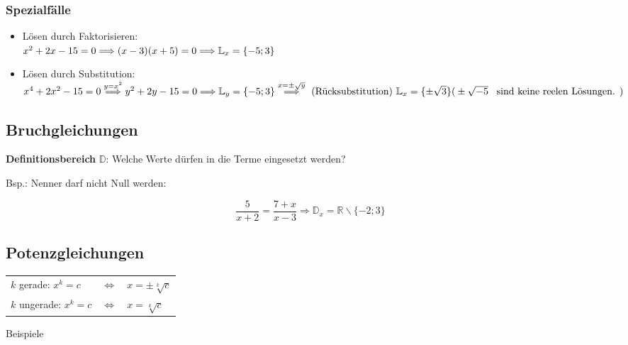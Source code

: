 \begin{multicols}{2}
\subsubsection*{Spezialfälle}
\begin{itemize}
\item Lösen durch Faktorisieren:\\
$x^2+2x-15=0 \Longrightarrow (x-3)(x+5)=0 \Longrightarrow \mathbb{L}_x=\{-5; 3\}$ %

\item Lösen durch Substitution:\\
$x^4+2x^2-15=0 \stackrel{y=x^2}{\Longrightarrow}\\
y^2+2y-15=0 \Longrightarrow \mathbb{L}_y=\{-5;3\} \stackrel{x=\pm{}\sqrt{y}}{\Longrightarrow}
\textrm{ (Rücksubstitution) } \mathbb{L}_x=\{\pm\sqrt{3}\}\\
\textrm{(} \pm\sqrt{-5} \textrm{ \, sind keine reelen Lösungen. )}$

\end{itemize}

\subsection*{Bruchgleichungen}

\textbf{Definitionsbereich} $\mathbb{D}$: Welche Werte dürfen in die Terme eingesetzt werden?

Bsp.: Nenner darf nicht Null werden:

$$\frac5{x+2}=\frac{7+x}{x-3} \Rightarrow{} \mathbb{D}_x=\mathbb{R}\backslash{}\{-2; 3\}$$

\subsection*{Potenzgleichungen}


\begin{tabular}{lcl}
$k$ gerade:   $x^k=c$ & $\Leftrightarrow$ & $x=\pm\sqrt[k]{c}$\\
$k$ ungerade: $x^k=c$ & $\Leftrightarrow$ & $x=\sqrt[k]{c}$\\
\end{tabular}

Beispiele


\end{multicols}
